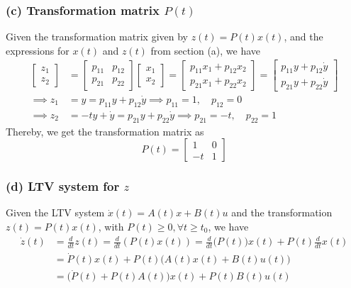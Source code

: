 \subsubsection*{(c) Transformation matrix \( P(t) \)}

Given the transformation matrix given by \( z(t) = P(t)x(t) \), and the expressions for \( x(t) \) and \( z(t) \) from section (a), we have
\begin{align*}
    \begin{bmatrix}
        z_1 \\
        z_2
    \end{bmatrix}
     & =
    \begin{bmatrix}
        p_{11} & p_{12} \\
        p_{21} & p_{22}
    \end{bmatrix}
    \begin{bmatrix}
        x_1 \\
        x_2
    \end{bmatrix}
    =
    \begin{bmatrix}
        p_{11} x_1 + p_{12} x_2 \\
        p_{21} x_1 + p_{22} x_2
    \end{bmatrix}
    =
    \begin{bmatrix}
        p_{11} y + p_{12} \dot y \\
        p_{21} y + p_{22} \dot y
    \end{bmatrix}
    \\
    \implies
    z_1
     & =
    y
    =
    p_{11} y + p_{12} \dot y
    \implies
    p_{11} = 1, \quad p_{12} = 0
    \\
    \implies
    z_2
     & =
    -t y + \dot y
    =
    p_{21} y + p_{22} \dot y
    \implies
    p_{21} = -t, \quad p_{22} = 1
\end{align*}
Thereby, we get the transformation matrix as
\begin{equation*}
    \boxed{
        P(t)
        =
        \begin{bmatrix}
            1  & 0 \\
            -t & 1
        \end{bmatrix}
    }
\end{equation*}

\subsubsection*{(d) LTV system for \( z \)}

Given the LTV system \( \dot{x}(t)=A(t) x+B(t) u \) and the transformation \( z(t)=P(t) x(t) \), with \( P(t) \geq 0, \forall t \geq t_{0} \), we have
\begin{align*}
    \dot{z}(t)
     & =
    \frac{d}{dt} z(t)
    =
    \frac{d}{dt} (P(t) x(t))
    =
    \frac{d}{dt} \Big(P(t)\Big) x(t) + P(t) \frac{d}{dt} x(t)
    \\
     & =
    \dot{P}(t) x(t) + P(t) \Big( A(t) x(t) + B(t) u(t) \Big)
    \\ & =
    \Big( \dot{P}(t) + P(t) A(t) \Big) x(t) + P(t) B(t) u(t)
\end{align*}

